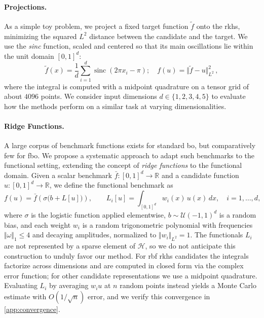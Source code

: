 \documentclass{article}
\newcommand{\R}{\mathbb{R}}
\newcommand{\Hs}{\mathcal{H}}
\newcommand{\vu}{u}
\begin{document}
\paragraph{Projections.}
As a simple toy problem, we project a fixed target function $\tilde{f}$ onto the \gls{rkhs}, minimizing the squared $L^2$ distance between the candidate and the target.
We use the \emph{sinc} function, scaled and centered so that its main oscillations lie within the unit domain $[0,1]^d$:
\begin{equation}
    \tilde{f}(x) = \frac{1}{d}\sum_{i=1}^d \operatorname{sinc}\!\left(2 \pi x_i - \pi\right);
    \quad
    f(\vu) = \Vert \tilde{f} - \vu\Vert_{L^2}^2 \,,
\end{equation}
where the integral is computed with a midpoint quadrature on a tensor grid of about $4096$ points.
We consider input dimensions $d \in \{1, 2, 3, 4, 5\}$ to evaluate how the methods perform on a similar task at varying dimensionalities.

\paragraph{Ridge Functions.}
A large corpus of benchmark functions exists for standard \gls{bo}, but comparatively few for \gls{fbo}.
We propose a systematic approach to adapt such benchmarks to the functional setting, extending the concept of \emph{ridge functions} to the functional domain.
Given a scalar benchmark $\bar{f}:[0,1]^d\to\R$ and a candidate function $\vu: [0,1]^d \to \R$, we define the functional benchmark as
\begin{equation}
    f(\vu) = \bar{f}\!\left(\sigma\big(b + L[\vu]\big)\right), \qquad L_i[\vu] = \int_{[0,1]^d} w_i(x)\, \vu(x)\, dx, \quad i=1,\ldots,d,
\end{equation}
where $\sigma$ is the logistic function applied elementwise, $b\sim\mathcal{U}(-1,1)^d$ is a random bias, and each weight $w_i$ is a random trigonometric polynomial with frequencies $\Vert \omega \Vert_1 \leq 4$ and decaying amplitudes, normalized to $\Vert w_i \Vert_{L^2}=1$.
The functionals $L_i$ are not represented by a sparse element of $\Hs$, so we do not anticipate this construction to unduly favor our method.
For \gls{rbf} \gls{rkhs} candidates the integrals factorize across dimensions and are computed in closed form via the complex error function; for other candidate representations we use a midpoint quadrature.
Evaluating $L_i$ by averaging $w_i \vu$ at $n$ random points instead yields a Monte Carlo estimate with $O(1/\sqrt{n})$ error, and we verify this convergence in \cref{app:convergence}.
\end{document}
